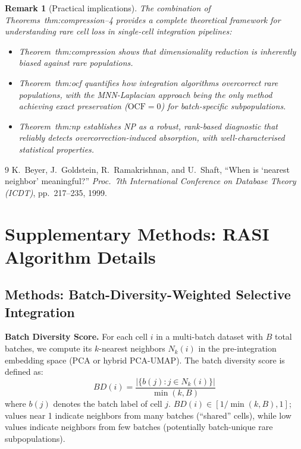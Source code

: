 \documentclass[10pt]{article}
\newtheorem{remark}[theorem]{Remark}
\begin{document}
\begin{remark}[Practical implications]
The combination of Theorems~{thm:compression}--4 provides
a complete theoretical framework for understanding rare cell loss in
single-cell integration pipelines:
\begin{itemize}
    \item Theorem~{thm:compression} shows that dimensionality reduction
    is inherently biased against rare populations.
    \item Theorem~{thm:ocf} quantifies how integration algorithms
    overcorrect rare populations, with the MNN-Laplacian approach being
    the only method achieving exact preservation ($\mathrm{OCF} = 0$)
    for batch-specific subpopulations.
    \item Theorem~{thm:np} establishes NP as a robust, rank-based
    diagnostic that reliably detects overcorrection-induced absorption,
    with well-characterised statistical properties.
\end{itemize}
\end{remark}

\begin{thebibliography}{9}
K.~Beyer, J.~Goldstein, R.~Ramakrishnan, and U.~Shaft,
``When is `nearest neighbor' meaningful?''
\textit{Proc.\ 7th International Conference on Database Theory (ICDT)},
pp.~217--235, 1999.
\end{thebibliography}


\section{Supplementary Methods: RASI Algorithm Details}



\subsection*{Methods: Batch-Diversity-Weighted Selective Integration}

\textbf{Batch Diversity Score.}
For each cell $i$ in a multi-batch dataset with $B$ total batches, we compute its $k$-nearest neighbors $N_k(i)$ in the pre-integration embedding space (PCA or hybrid PCA-UMAP). The batch diversity score is defined as:
\begin{equation}
BD(i) = \frac{|\{b(j) : j \in N_k(i)\}|}{\min(k, B)}
\end{equation}
where $b(j)$ denotes the batch label of cell $j$. $BD(i) \in [1/\min(k,B), 1]$; values near 1 indicate neighbors from many batches (``shared'' cells), while low values indicate neighbors from few batches (potentially batch-unique rare subpopulations).
\end{document}
